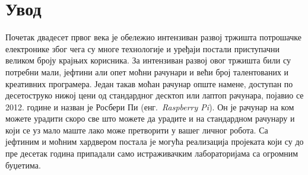 \documentclass[12pt,oneside]{memoir}
\theoremstyle{remark}
\begin{document}
\frontmatter
\naslovna
\komisija
\apstrakt
\tableofcontents*

\mainmatter

\chapter{Увод}
\label{chp:uvod}
Почетак двадесет првог века је обележио интензиван развој тржишта потрошачке електронике због чега су многе технологије и уређаји постали приступачни великом броју крајњих корисника. За интензиван развој овог тржишта били су потребни мали, јефтини али опет моћни рачунари и већи број талентованих и креативних програмера. Један такав моћан рачунар опште намене, доступан по десетоструко нижој цени од стандардног десктоп или лаптоп рачунара, појавио се 2012. године и назван је Росбери Пи (енг.~{\em Raspberry Pi}). Он је рачунар на ком можете урадити скоро све што можете да урадите и на стандардном рачунару и који се уз мало маште лако може претворити у вашег личног робота. Са јефтиним и моћним хардвером постала је могућа реализација пројеката који су до пре десетак година припадали само истраживачким лабораторијама са огромним буџетима.
\end{document}
